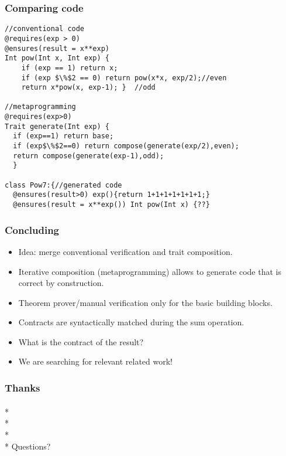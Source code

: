 \begin{frame}[fragile]
\frametitle{Comparing code}
\vspace{-1ex}
\begin{Scaled}{0.9}{0.9}
\begin{lstlisting}
//conventional code
@requires(exp > 0)
@ensures(result = x**exp)
Int pow(Int x, Int exp) {
	if (exp == 1) return x;
	if (exp $\%$2 == 0) return pow(x*x, exp/2);//even
	return x*pow(x, exp-1); }  //odd

//metaprogramming
@requires(exp>0)
Trait generate(Int exp) {
  if (exp==1) return base;
  if (exp$\%$2==0) return compose(generate(exp/2),even);
  return compose(generate(exp-1),odd);
  }

class Pow7:{//generated code
  @ensures(result>0) exp(){return 1+1+1+1+1+1+1;}
  @ensures(result = x**exp()) Int pow(Int x) {??}
\end{lstlisting}
\end{Scaled}
\end{frame}

\begin{frame}[fragile]
\frametitle{Concluding}
\begin{itemize}
\item Idea: merge conventional verification and trait composition.
\item Iterative composition (metaprogramming) allows to generate
code that is correct by construction.
\item Theorem prover/manual verification  only for the basic building blocks.
\item Contracts are syntactically matched during the sum operation.
\item What is the contract of the result?
\item We are searching for relevant related work!
\end{itemize}
\end{frame}


\begin{frame}[fragile]
\frametitle{Thanks}
${}_{}$\\*
${}_{}$\\*
${}_{}$\\*
${}_{}$\\*
Questions?
\end{frame}


